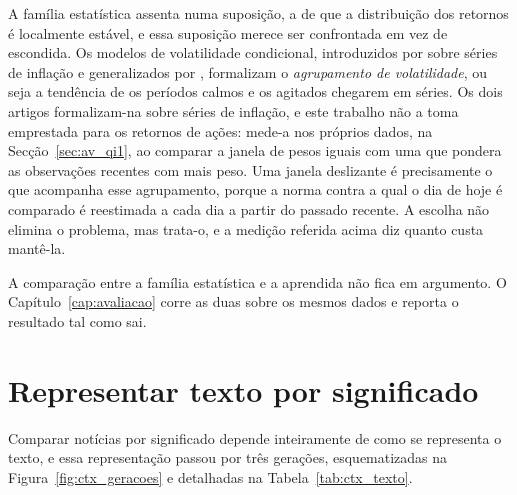 A família estatística assenta numa suposição, a de que a distribuição dos retornos é localmente
estável, e essa suposição merece ser confrontada em vez de escondida. Os modelos de volatilidade
condicional, introduzidos por \textcite{engle1982arch} sobre séries de inflação e generalizados por
\textcite{bollerslev1986garch}, formalizam o \emph{agrupamento de volatilidade}, ou seja a tendência
de os períodos calmos e os agitados chegarem em séries. Os dois artigos formalizam-na sobre séries
de inflação, e este trabalho não a toma emprestada para os retornos de ações: mede-a nos próprios
dados, na Secção~\ref{sec:av_qi1}, ao comparar a janela de pesos iguais com uma que pondera as
observações recentes com mais peso. Uma janela
deslizante é precisamente o que acompanha esse agrupamento, porque a norma contra a qual o dia de
hoje é comparado é reestimada a cada dia a partir do passado recente. A escolha não elimina o
problema, mas trata-o, e a medição referida acima diz quanto custa mantê-la.

A comparação entre a família estatística e a aprendida não fica em argumento. O
Capítulo~\ref{cap:avaliacao} corre as duas sobre os mesmos dados e reporta o resultado tal como sai.

\section{Representar texto por significado}
\label{sec:ctx_texto}

Comparar notícias por significado depende inteiramente de como se representa o texto, e essa
representação passou por três gerações, esquematizadas na Figura~\ref{fig:ctx_geracoes} e detalhadas
na Tabela~\ref{tab:ctx_texto}.

